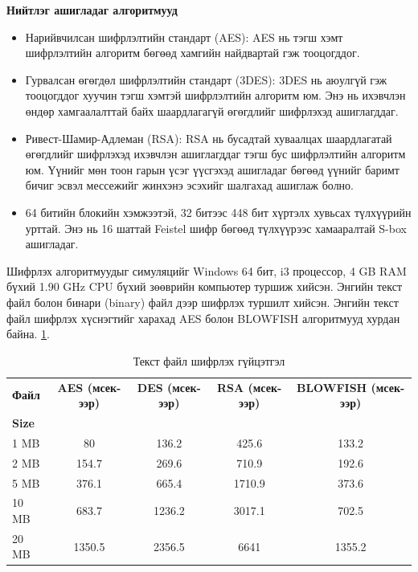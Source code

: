 \textbf{Нийтлэг ашигладаг алгоритмууд}
\begin{itemize}
    \item Нарийвчилсан шифрлэлтийн стандарт (AES): AES нь тэгш хэмт шифрлэлтийн алгоритм бөгөөд хамгийн найдвартай гэж тооцогддог.
    \item Гурвалсан өгөгдөл шифрлэлтийн стандарт (3DES): 3DES нь аюулгүй гэж тооцогддог хуучин тэгш хэмтэй шифрлэлтийн алгоритм юм. Энэ нь ихэвчлэн өндөр хамгаалалттай байх шаардлагагүй өгөгдлийг шифрлэхэд ашиглагддаг.
    \item Ривест-Шамир-Адлеман (RSA): RSA нь бусадтай хуваалцах шаардлагатай өгөгдлийг шифрлэхэд ихэвчлэн ашиглагддаг тэгш бус шифрлэлтийн алгоритм юм. Үүнийг мөн тоон гарын үсэг үүсгэхэд ашигладаг бөгөөд үүнийг баримт бичиг эсвэл мессежийг жинхэнэ эсэхийг шалгахад ашиглаж болно.
    \item 64 битийн блокийн хэмжээтэй, 32 битээс 448 бит хүртэлх хувьсах түлхүүрийн урттай. Энэ нь 16 шаттай Feistel шифр бөгөөд түлхүүрээс хамааралтай S-box ашигладаг.
\end{itemize}
Шифрлэх алгоритмуудыг симуляцийг Windows 64 бит, i3 процессор, 4 GB RAM бүхий 1.90 GHz CPU бүхий зөөврийн компьютер туршиж хийсэн. Энгийн текст файл болон бинари (binary) файл дээр шифрлэх туршилт хийсэн.
Энгийн текст файл шифрлэх хүснэгтийг харахад AES болон BLOWFISH алгоритмууд хурдан байна. \ref{tab:encrypt_performance_text}.

\begin{table}[H]
    \caption{Текст файл шифрлэх гүйцэтгэл}
    \footnotesize
    \begin{tabular}{|l|c|c|c|c|}
        \hline
        \textbf{Файл} & \textbf{AES (мсек-ээр)} & \textbf{DES (мсек-ээр)} & \textbf{RSA (мсек-ээр)} & \textbf{BLOWFISH (мсек-ээр)} \\
        \textbf{Size} &                         &                         &                         &                              \\
        \hline
        1 MB          & 80                      & 136.2                   & 425.6                   & 133.2                        \\
        \hline
        2 MB          & 154.7                   & 269.6                   & 710.9                   & 192.6                        \\
        \hline
        5 MB          & 376.1                   & 665.4                   & 1710.9                  & 373.6                        \\
        \hline
        10 MB         & 683.7                   & 1236.2                  & 3017.1                  & 702.5                        \\
        \hline
        20 MB         & 1350.5                  & 2356.5                  & 6641                    & 1355.2                       \\
        \hline
    \end{tabular}
    \label{tab:encrypt_performance_text}
\end{table}

